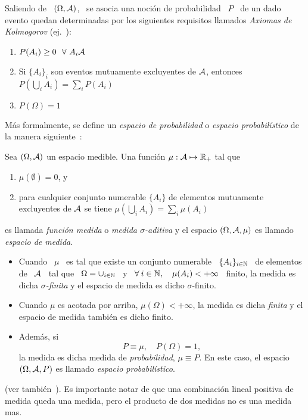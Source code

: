 Saliendo de \ $(\Omega,\mathcal{A})$, \ se asocia una noci\'on de probabilidad \ $P$ \ de
un dado evento  quedan determinadas por los siguientes  requisitos llamados {\it
  Axiomas de Kolmogorov} (ej.~\cite{Spi76, Kol56, ShaVov06, Pla05}):
%
\begin{enumerate}
\item $P(A_i) \geq 0 \ \ \forall \ A_i \mathcal{A}$
%
\item  Si $\{ A_i  \}_i$ son  eventos mutuamente  excluyentes de  $\mathcal{A}$, entonces
  $\displaystyle P\left( \bigcup_i A_i \right) = \sum_i P(A_i)$
%
\item $P(\Omega) = 1$
\end{enumerate}
%
M\'as formalmente,  se define  un {\it espacio  de probabilidad} o  {\it espacio
  probabil\'istico}  de la  manera siguiente~\cite{Hal50,  Fel68,  Fel71, Bre88,
  IbaPar97, AthLah06, Bog07:v1, JacPro03, Coh13}:
%
\begin{definicion}
  Sea $(\Omega,\mathcal{A})$ un espacio medible.  Una funci\'on $\mu: \mathcal{A} \mapsto \mathbb{R}_+$
  tal que
  \begin{enumerate}
  \item $\mu(\emptyset) = 0$, y
  \item para  cualquier conjunto numerable  $\{ A_i \}$ de  elementos mutuamente
    excluyentes  de $\mathcal{A}$  se tiene  $\mu\left(  \bigcup_i A_i  \right) =  \sum_i
    \mu(A_i)$
  \end{enumerate}
  es  llamada {\it  funci\'on  medida}  o {\it  medida  $\sigma$-aditiva} y  el
  espacio $(\Omega,\mathcal{A},\mu)$ es  llamado {\it espacio de medida}.
  \begin{itemize}
  \item Cuando \ $\mu$ \ es tal que existe un conjunto numerable \ $\{ A_i \}_{i
      \in \mathbb{N}}$  \ de elementos  de \  $\mathcal{A}$ \ tal  que \ $\Omega  = \cup_{i\in
      \mathbb{N}}$ \ y \ $\forall \: i \in \mathbb{N}, \quad \mu(A_i) < +\infty$ \ finito,
    la medida  es dicha {\it  $\sigma$-finita} y el  espacio de medida  es dicho
    $\sigma$-finito.
  \item Cuando $\mu$ es acotada por  arriba, $\mu(\Omega) < + \infty$, la medida
    es dicha {\it finita} y el espacio de medida tambi\'en es dicho finito.
  \item Adem\'as, si \[ P \equiv \mu, \quad P(\Omega) = 1, \] la medida es dicha
    medida  de {\it probabilidad},  $\mu \equiv  P$.  En  este caso,  el espacio
    $(\Omega,\mathcal{A},P)$ es llamado {\it espacio probabil\'istico}.
\end{itemize}
\end{definicion}
%
\noindent (ver  tambi\'en~\cite[Cap.~5 \& 6]{KolFom61}). Es  importante notar de
que  una combinaci\'on  lineal  positiva de  medida  queda una  medida, pero  el
producto de dos medidas no es una medida mas.

